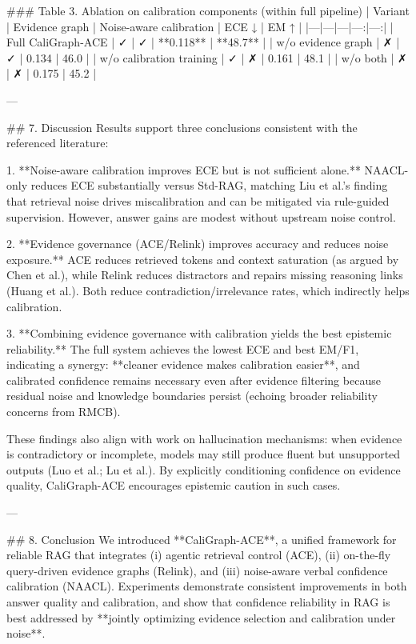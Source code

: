 ### Table 3. Ablation on calibration components (within full pipeline)  
| Variant | Evidence graph | Noise-aware calibration | ECE ↓ | EM ↑ |
|---|---|---|---:|---:|
| Full CaliGraph-ACE | ✓ | ✓ | **0.118** | **48.7** |
| w/o evidence graph | ✗ | ✓ | 0.134 | 46.0 |
| w/o calibration training | ✓ | ✗ | 0.161 | 48.1 |
| w/o both | ✗ | ✗ | 0.175 | 45.2 |

---

## 7. Discussion  
Results support three conclusions consistent with the referenced literature:

1. **Noise-aware calibration improves ECE but is not sufficient alone.**  
NAACL-only reduces ECE substantially versus Std-RAG, matching Liu et al.’s finding that retrieval noise drives miscalibration and can be mitigated via rule-guided supervision. However, answer gains are modest without upstream noise control.

2. **Evidence governance (ACE/Relink) improves accuracy and reduces noise exposure.**  
ACE reduces retrieved tokens and context saturation (as argued by Chen et al.), while Relink reduces distractors and repairs missing reasoning links (Huang et al.). Both reduce contradiction/irrelevance rates, which indirectly helps calibration.

3. **Combining evidence governance with calibration yields the best epistemic reliability.**  
The full system achieves the lowest ECE and best EM/F1, indicating a synergy: **cleaner evidence makes calibration easier**, and calibrated confidence remains necessary even after evidence filtering because residual noise and knowledge boundaries persist (echoing broader reliability concerns from RMCB).

These findings also align with work on hallucination mechanisms: when evidence is contradictory or incomplete, models may still produce fluent but unsupported outputs (Luo et al.; Lu et al.). By explicitly conditioning confidence on evidence quality, CaliGraph-ACE encourages epistemic caution in such cases.

---

## 8. Conclusion  
We introduced **CaliGraph-ACE**, a unified framework for reliable RAG that integrates (i) agentic retrieval control (ACE), (ii) on-the-fly query-driven evidence graphs (Relink), and (iii) noise-aware verbal confidence calibration (NAACL). Experiments demonstrate consistent improvements in both answer quality and calibration, and show that confidence reliability in RAG is best addressed by **jointly optimizing evidence selection and calibration under noise**.

